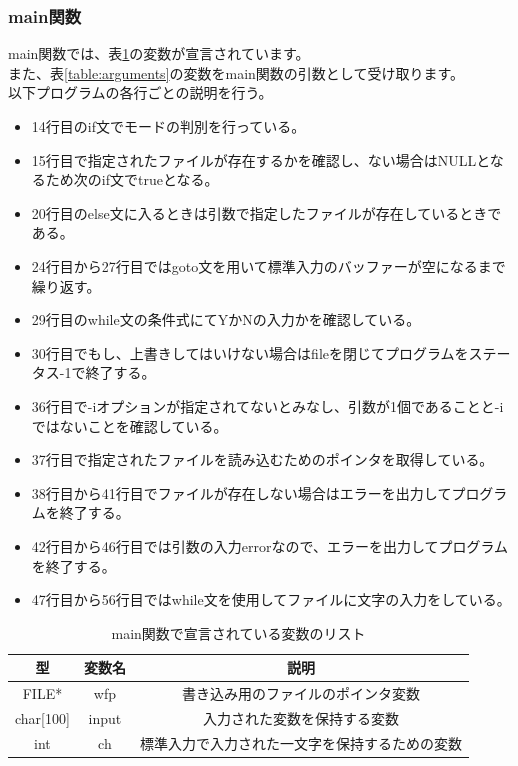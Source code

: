 \documentclass[dvipdfmx]{jsarticle}
\begin{document}
\subsubsection{main関数}
main関数では、表\ref{table:variables}の変数が宣言されています。\\
また、表\ref{table:arguments}の変数をmain関数の引数として受け取ります。\\
以下プログラムの各行ごとの説明を行う。
\begin{itemize}
  \item 14行目のif文でモードの判別を行っている。
  \item 15行目で指定されたファイルが存在するかを確認し、ない場合はNULLとなるため次のif文でtrueとなる。
  \item 20行目のelse文に入るときは引数で指定したファイルが存在しているときである。
  \item 24行目から27行目ではgoto文を用いて標準入力のバッファーが空になるまで繰り返す。
  \item 29行目のwhile文の条件式にてYかNの入力かを確認している。
  \item 30行目でもし、上書きしてはいけない場合はfileを閉じてプログラムをステータス-1で終了する。
  \item 36行目で-iオプションが指定されてないとみなし、引数が1個であることと-iではないことを確認している。
  \item 37行目で指定されたファイルを読み込むためのポインタを取得している。
  \item 38行目から41行目でファイルが存在しない場合はエラーを出力してプログラムを終了する。
  \item 42行目から46行目では引数の入力errorなので、エラーを出力してプログラムを終了する。
  \item 47行目から56行目ではwhile文を使用してファイルに文字の入力をしている。
\end{itemize}



\begin{table}[ht]
  \centering
  \begin{tabular}{|c|c|c|}
    \hline
    型     & 変数名 & 説明                         \\
    \hline
    FILE* & wfp & 書き込み用のファイルのポインタ変数          \\
    char[100] & input & 入力された変数を保持する変数             \\
    int   & ch  & 標準入力で入力された一文字を保持するための変数 \\
    \hline
  \end{tabular}
  \caption{main関数で宣言されている変数のリスト}
  \label{table:variables}
\end{table}
\end{document}
